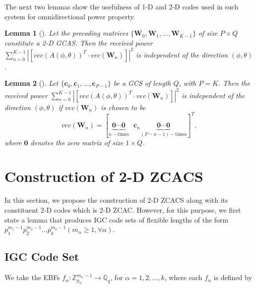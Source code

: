 \documentclass[pdflatex,sn-mathphys-num]{sn-jnl}%
\theoremstyle{thmstyleone}
\newtheorem{lemma}{Lemma}
\begin{document}
	The next two lemmas show the usefulness of 1-D and 2-D codes used in such system for omnidirectional power property.
	\begin{lemma}[\cite{Omni2}]\label{lemma_GCAS_omni}
		Let the precoding matrices $\{\mathbf{W}_0, \mathbf{W}_1, \dots, \mathbf{W}_{K-1}\}$ of size $P \times Q$ constitute a 2-D GCAS. Then the received power $\sum_{n=0}^{K-1} \left|  \left[vec(A(\phi, \theta))^T \cdot vec(\mathbf{W}_n)\right] \right|^2$ is independent of the direction $(\phi, \theta)$. 
	\end{lemma}
	\begin{lemma}[\cite{Omni1}]\label{lemma_CS_omni}
		Let $\{\mathbf{c}_0, \mathbf{c}_1, \dots, \mathbf{c}_{P-1}\}$ be a GCS of length $Q$, with $P=K$. Then the received power $\sum_{n=0}^{K-1} \left|  \left[vec(A(\phi, \theta))^T \cdot vec(\mathbf{W}_n)\right] \right|^2$ is independent of the direction $(\phi, \theta)$ if $vec(\mathbf{W}_n)$ is chosen to be
		\begin{equation}
			vec(\mathbf{W}_n)= \left[  \underbrace{\mathbf{0} \cdots \mathbf{0}}_{n-\text{times}}~~~  \mathbf{c}_n  \underbrace{\mathbf{0} \cdots \mathbf{0}}_{(P-n-1)-\text{times}} \right]^{T},
		\end{equation}
		where $\mathbf{0}$ denotes the zero matrix of size $1 \times Q$.
	\end{lemma}
	
	
	
	\section{Construction of 2-D ZCACS}\label{sec3}
	In this section, we propose the construction of 2-D ZCACS along with its constituent 2-D codes which is 2-D ZCAC. However, for this purpose, we first state a lemma that produces IGC code sets of flexible lengths of the form $p_1^{m_1-1} p_2^{m_2-1} \dots p_k^{m_k-1} (m_\alpha \geq1, \forall \alpha)$.
	
	
	\subsection{IGC Code Set}
	We take the EBFs
	$f_\alpha : \mathbb{Z}_{p_\alpha}^{m_\alpha-1} \rightarrow \mathbb{Q}_q$, 
	for $\alpha = 1, 2, \dots, k$, where each $f_\alpha$ is defined by
	
\end{document}
